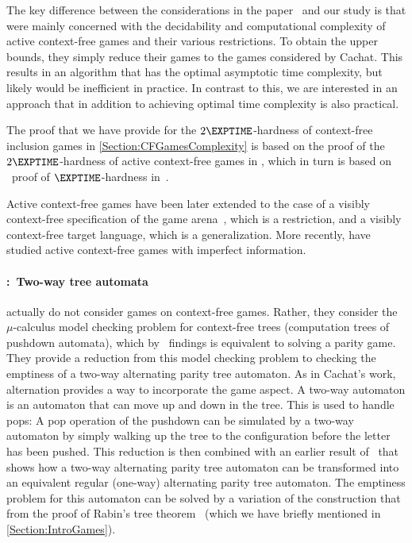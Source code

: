 \documentclass[../../diss.tex]{subfiles}
\begin{document}
The key difference between the considerations in the paper~\cite{MuschollSS06} and our study is that \citeauthor{MuschollSS06} were mainly concerned with the decidability and computational complexity of active context-free games and their various restrictions.
To obtain the upper bounds, they simply reduce their games to the games considered by Cachat.
This results in an algorithm that has the optimal asymptotic time complexity, but likely would be inefficient in practice.
In contrast to this, we are interested in an approach that in addition to achieving optimal time complexity is also practical.

The proof that we have provide for the $2\EXPTIME$-hardness of context-free inclusion games in \cref{Section:CFGamesComplexity} is based on the proof of the $2\EXPTIME$-hardness of active context-free games in \cite{MuschollSS06}, which in turn is based on \Walus~proof of $\EXPTIME$-hardness in~\cite{Walukiewicz01}.

Active context-free games have been later extended to the case of a visibly context-free specification of the game arena~\cite{SchusterS15}, which is a restriction, and a visibly context-free target language, which is a generalization.
More recently,  have studied active context-free games with imperfect information.


\paragraph{\citeauthor{KupfermanV00}:~Two-way tree automata}

 actually do not consider games on context-free games.
Rather, they consider the $\mu$-calculus model checking problem for context-free trees (computation trees of pushdown automata), which by \Walus~findings is equivalent to solving a parity game.
They provide a reduction from this model checking problem to checking the emptiness of a two-way alternating parity tree automaton.
As in Cachat's work, alternation provides a way to incorporate the game aspect.
A two-way automaton is an automaton that can move up and down in the tree.
This is used to handle pops: A pop operation of the pushdown can be simulated by a two-way automaton by simply walking up the tree to the configuration before the letter has been pushed.
This reduction is then combined with an earlier result of~ that shows how a two-way alternating parity tree automaton can be transformed into an equivalent regular (one-way) alternating parity tree automaton.
The emptiness problem for this automaton can be solved by a variation of the construction that from the proof of Rabin's tree theorem~\cite{Zielonka98} (which we have briefly mentioned in \cref{Section:IntroGames}).
\end{document}
